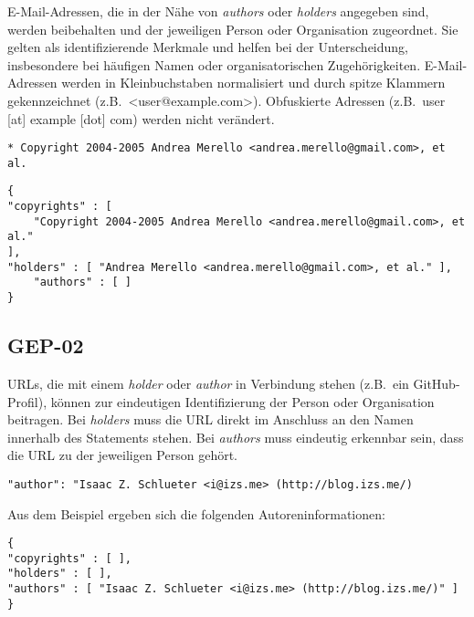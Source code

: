 E-Mail-Adressen, die in der Nähe von \textit{authors} oder \textit{holders} angegeben sind, werden beibehalten und der jeweiligen Person oder Organisation zugeordnet.
Sie gelten als identifizierende Merkmale und helfen bei der Unterscheidung, insbesondere bei häufigen Namen oder organisatorischen Zugehörigkeiten.
E-Mail-Adressen werden in Kleinbuchstaben normalisiert und durch spitze Klammern gekennzeichnet (z.B.\ <user@example.com>).
Obfuskierte Adressen (z.B.\ user [at] example [dot] com) werden nicht verändert.

\begin{lstlisting}[keepspaces=true]
* Copyright 2004-2005 Andrea Merello <andrea.merello@gmail.com>, et al.
\end{lstlisting}

\begin{lstlisting}[keepspaces=true]
{
"copyrights" : [
    "Copyright 2004-2005 Andrea Merello <andrea.merello@gmail.com>, et al."
],
"holders" : [ "Andrea Merello <andrea.merello@gmail.com>, et al." ],
    "authors" : [ ]
}
\end{lstlisting}


\subsection{GEP-02}\label{subsec:gep-02}

URLs, die mit einem \textit{holder} oder \textit{author} in Verbindung stehen (z.B.\ ein GitHub-Profil), können zur eindeutigen Identifizierung der Person oder Organisation beitragen.
Bei \textit{holders} muss die URL direkt im Anschluss an den Namen innerhalb des Statements stehen.
Bei \textit{authors} muss eindeutig erkennbar sein, dass die URL zu der jeweiligen Person gehört.

\begin{lstlisting}[keepspaces=true]
"author": "Isaac Z. Schlueter <i@izs.me> (http://blog.izs.me/)
\end{lstlisting}

Aus dem Beispiel ergeben sich die folgenden Autoreninformationen:

\begin{lstlisting}[keepspaces=true]
{
"copyrights" : [ ],
"holders" : [ ],
"authors" : [ "Isaac Z. Schlueter <i@izs.me> (http://blog.izs.me/)" ]
}
\end{lstlisting}

